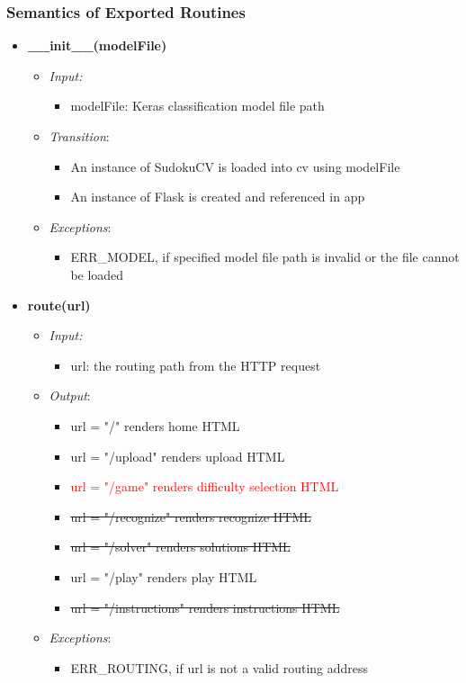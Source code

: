 \documentclass[11pt]{article}
\begin{document}
		\subsubsection{Semantics of Exported Routines}
		\begin{itemize}
		    \item \textbf{\_\_init\_\_(modelFile)}
		\begin{itemize}
		    \item[] \textit{Input: }
			\begin{itemize}
		        \item modelFile: Keras classification model file path
		    \end{itemize}	    
		    
		    \item[] \textit{Transition}: 
		    \begin{itemize}
		        \item An instance of SudokuCV is loaded into cv using modelFile
		        \item An instance of Flask is created and referenced in app
		    \end{itemize}
		    \item[] \textit{Exceptions}:
			\begin{itemize}
		        \item ERR\_MODEL, if specified model file path is invalid or the file cannot be loaded
		    \end{itemize}	  
		\end{itemize}
		
	    \item \textbf{route(url)}
		\begin{itemize}
		    \item[] \textit{Input: } 
		    \begin{itemize}
		        \item url: the routing path from the HTTP request
		    \end{itemize}	  
		    \item[] \textit{Output}: 
		    \begin{itemize}
		        \item url = "/" renders home HTML
		        \item url = "/upload" renders upload HTML
		        \item \textcolor{red}{url = "/game" renders difficulty selection HTML}
		        \item \sout{url = "/recognize" renders recognize HTML}
		        \item \sout{url = "/solver" renders solutions HTML}
		        \item url = "/play" renders play HTML
		        \item \sout{url = "/instructions" renders instructions HTML}
		    \end{itemize}
		    \item[] \textit{Exceptions}:
		    \begin{itemize}
		        \item ERR\_ROUTING, if url is not a valid routing address
		    \end{itemize}
		\end{itemize}
		

\end{itemize}
\end{document}
